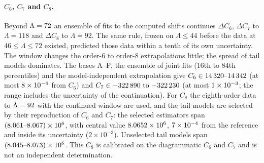 \paragraph{$C_6$, $C_7$ and $C_8$.} Beyond $\Lambda=72$ an ensemble of fits to the computed shifts continues
$\Delta C_6$, $\Delta C_7$ to $\Lambda=118$ and $\Delta C_8$ to $\Lambda=92$. The same rule, frozen on $\Lambda\le44$ before the data at $46\le\Lambda\le72$ existed, predicted those data within a tenth
of its own uncertainty. The window changes the order-6 to order-8 extrapolations little; the spread of tail models
dominates. The bases A--F, the ensemble of joint fits (16th to 84th percentiles) and the model-independent
extrapolation give $C_6\in14\,320\text{--}14\,342$
(at most $8\times10^{-4}$ from $C_6$) and $C_7\in-322\,890\text{ to }{-322\,230}$ (at most $1\times10^{-3}$; the range includes the
uncertainty of the continuation). For $C_8$ the eighth-order data to $\Lambda=92$ with the continued window
are used, and the tail models are selected by their reproduction of $C_6$ and $C_7$: the selected estimators span
$(8.061\text{--}8.067)\times10^6$, with central value $8.0652\times10^{6}$, $7\times10^{-4}$ from the reference and inside
its uncertainty ($2\times10^{-3}$). Unselected tail models span $(8.045\text{--}8.073)\times10^6$. This $C_8$ is calibrated
on the diagrammatic $C_6$ and $C_7$ and is not an independent determination.

